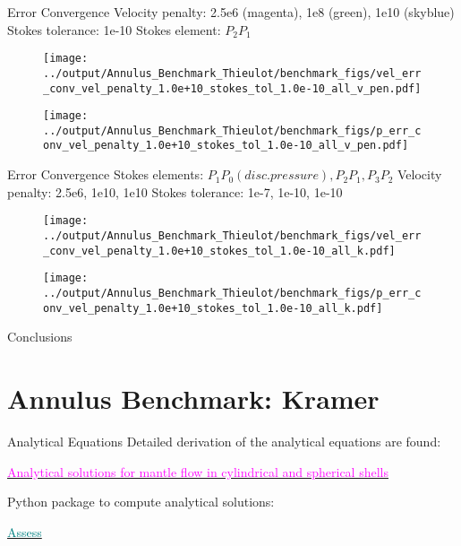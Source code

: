\documentclass[10pt,aspectratio=169]{beamer}
\begin{document}
\begin{frame}{Error Convergence}
	Velocity penalty: 2.5e6 (magenta), 1e8 (green), 1e10 (skyblue) \newline
	Stokes tolerance: 1e-10 \newline
	Stokes element: $P_{2}P_{1}$
	\begin{figure}[!htb]
		\begin{multicols}{2}
			\texttt{[image: ../output/Annulus\_Benchmark\_Thieulot/benchmark\_figs/vel\_err\_conv\_vel\_penalty\_1.0e+10\_stokes\_tol\_1.0e-10\_all\_v\_pen.pdf]}\par
			\hspace{3.0in} 
			\texttt{[image: ../output/Annulus\_Benchmark\_Thieulot/benchmark\_figs/p\_err\_conv\_vel\_penalty\_1.0e+10\_stokes\_tol\_1.0e-10\_all\_v\_pen.pdf]}
		\end{multicols}
	\end{figure}
\end{frame}

\begin{frame}{Error Convergence}
	Stokes elements: $P_{1}P_{0} (disc. pressure), P_{2}P_{1}, P_{3}P_{2}$  \newline
	Velocity penalty: 2.5e6, 1e10, 1e10 \newline
	Stokes tolerance: 1e-7, 1e-10, 1e-10
	\begin{figure}[!htb]
		\begin{multicols}{2}
			\texttt{[image: ../output/Annulus\_Benchmark\_Thieulot/benchmark\_figs/vel\_err\_conv\_vel\_penalty\_1.0e+10\_stokes\_tol\_1.0e-10\_all\_k.pdf]}\par
			\hspace{3.0in} 
			 \texttt{[image: ../output/Annulus\_Benchmark\_Thieulot/benchmark\_figs/p\_err\_conv\_vel\_penalty\_1.0e+10\_stokes\_tol\_1.0e-10\_all\_k.pdf]}
		\end{multicols}
	\end{figure}
\end{frame}

\begin{frame}{Conclusions}

\end{frame}

\section{Annulus Benchmark: Kramer}

\begin{frame}{Analytical Equations}
	Detailed derivation of the analytical equations are found:
	
	\href{https://gmd.copernicus.org/articles/14/1899/2021/}{\textcolor{magenta}{Analytical solutions for mantle flow in cylindrical and spherical shells}}
	
	\vspace{0.25in}
	
	Python package to compute analytical solutions:
	
	\href{https://assess.readthedocs.io/en/latest/}{\textcolor{teal}{Assess}}
\end{frame}
\end{document}
